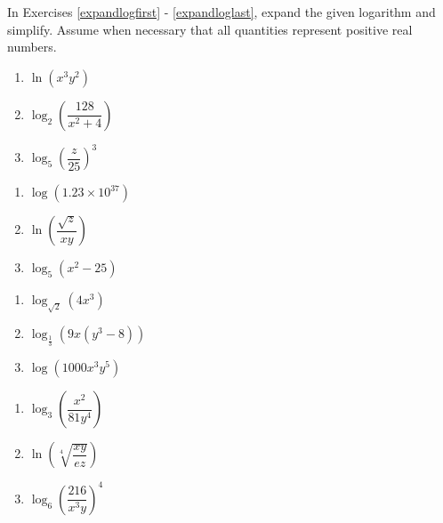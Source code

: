 \label{ExercisesforPropertiesofLogarithms}

In Exercises \ref{expandlogfirst} - \ref{expandloglast}, expand the given logarithm and simplify.  Assume when necessary that all quantities represent positive real numbers.

\begin{multicols}{3}
\begin{enumerate}

\item $\ln(x^{3}y^{2})$  \label{expandlogfirst}
\item $\log_{2}\left(\dfrac{128}{x^{2} + 4}\right)$
\item $\log_{5}\left(\dfrac{z}{25}\right)^{3}$ 

\setcounter{HW}{\value{enumi}}
\end{enumerate}
\end{multicols}

\begin{multicols}{3}
\begin{enumerate}
\setcounter{enumi}{\value{HW}}

\item $\log(1.23 \times 10^{37})$ 
\item $\ln\left(\dfrac{\sqrt{z}}{xy}\right)$
\item $\log_{5} \left(x^2 - 25 \right)$ 

\setcounter{HW}{\value{enumi}}
\end{enumerate}
\end{multicols}

\begin{multicols}{3}
\begin{enumerate}
\setcounter{enumi}{\value{HW}}

\item $\log_{\sqrt{2}} \left(4x^3\right)$
\item $\log_{\frac{1}{3}}(9x(y^{3} - 8))$
\item $\log\left(1000x^3y^5\right)$

\setcounter{HW}{\value{enumi}}
\end{enumerate}
\end{multicols}

\begin{multicols}{3}
\begin{enumerate}
\setcounter{enumi}{\value{HW}}

\item $\log_{3} \left(\dfrac{x^2}{81y^4}\right)$
\item $\ln\left(\sqrt[4]{\dfrac{xy}{ez}}\right)$
\item $\log_{6} \left(\dfrac{216}{x^3y}\right)^4$

\setcounter{HW}{\value{enumi}}
\end{enumerate}
\end{multicols}

